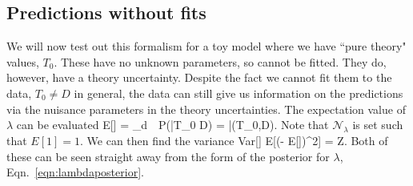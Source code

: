 \subsection{Predictions without fits}
We will now test out this formalism for a toy model where we have ``pure theory" values, $T_0$. These have no unknown parameters, so cannot be fitted. They do, however, have a theory uncertainty. Despite the fact we cannot fit them to the data, $T_0 \neq D$ in general, the data can still give us information on the predictions via the nuisance parameters in the theory uncertainties. The expectation value of $\lambda$ can be evaluated 
\be
E[\lambda] = _\lambda \int d\lambda \ \lambda\ P(\lambda |T_0 D) = \bar{\lambda}(T_0,D).
\ee
Note that $\mathcal{N}_\lambda$ is set such that $E[1]=1$. We can then find the variance
\be 
Var[\lambda] \equiv E[(\lambda - E[\lambda])^2] = Z.
\ee
Both of these can be seen straight away from the form of the posterior for $\lambda$, Eqn.~\ref{eqn:lambdaposterior}.

